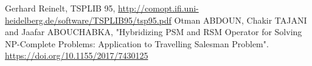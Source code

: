 \begin{thebibliography}{...}

Gerhard Reinelt,
TSPLIB 95,
\url{http://comopt.ifi.uni-heidelberg.de/software/TSPLIB95/tsp95.pdf}
Otman ABDOUN, Chakir TAJANI and Jaafar ABOUCHABKA, "Hybridizing PSM and RSM Operator for Solving NP-Complete Problems: Application to Travelling Salesman Problem". \url{https://doi.org/10.1155/2017/7430125}
\end{thebibliography}